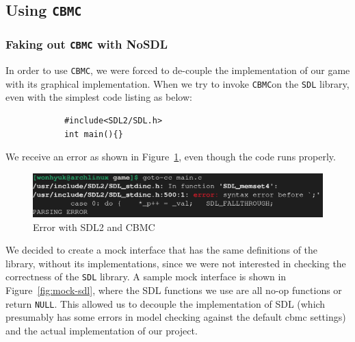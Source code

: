 \documentclass{article}
\newcommand{\cbmc}{\texttt{CBMC}}
\begin{document}
    \subsection{Using \cbmc{}}

        \subsubsection{Faking out \cbmc{} with NoSDL}

            In order to use \cbmc, we were forced to de-couple the
            implementation of our game with its graphical implementation.
            When we try to invoke \cbmc on the \texttt{SDL} library, even with
            the simplest code listing as below:

            \begin{verbatim}
            #include<SDL2/SDL.h>
            int main(){}
            \end{verbatim}

            We receive an error as shown in Figure~\ref{fig:cbmc-sdl}, even
            though the code runs properly.

            \begin{figure}[h!]
                \includegraphics[width=\linewidth]{cbmc-sdl.png}
                \caption{Error with SDL2 and CBMC}
                \label{fig:cbmc-sdl}
            \end{figure}

            We decided to create a mock interface that has the same definitions
            of the library, without its implementations, since we were not
            interested in checking the correctness of the \texttt{SDL} library.
            A sample mock interface is shown in Figure~\ref{fig:mock-sdl}, where
            the SDL functions we use are all no-op functions or return
            \texttt{NULL}. This allowed us to decouple the implementation of
            SDL (which presumably has some errors in model checking against the
            default cbmc settings) and the actual implementation of our project.
\end{document}
